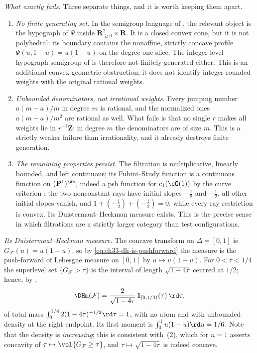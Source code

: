 \begin{example}
\emph{What exactly fails.}  Three separate things, and it is worth keeping
them apart.
\begin{enumerate}
\item \emph{No finite generating set.}  In the semigroup language of
 , the relevant object is the
 hypograph of $\Psi$ inside $\mathbf R^2_{\geq0}\times\mathbf R$.  It is
 a closed convex cone, but it is not polyhedral: its boundary contains the
 nonaffine, strictly concave profile
 $\Psi(u,1-u)=u(1-u)$ on the degree-one slice.
 The integer-level hypograph semigroup of
  is therefore not finitely
 generated either.  This is an additional convex-geometric obstruction;
 it does not identify integer-rounded weights with the original
 rational weights.
\item \emph{Unbounded denominators, not irrational weights.}  Every jumping
 number $a(m-a)/m$ in degree $m$ is rational, and the normalized ones
 $a(m-a)/m^2$ are rational as well.  What fails is that no single $r$
 makes all weights lie in $r^{-1}\mathbf Z$: in degree $m$ the
 denominators are of size $m$.  This is a strictly weaker failure than
 irrationality, and it already destroys finite generation.
 \item \emph{The remaining properties persist.}  The filtration is multiplicative,
 linearly bounded, and left continuous; its Fubini--Study function is a
 continuous function on $(\mathbf P^1)^{\An}$, indeed a
 psh function for $c_1(\cO(1))$ by the curve criterion
 \cite[Example~4.13]{BJ22}: the two nonconstant rays have initial slopes
 $-\tfrac12$ and $-\tfrac12$, all other initial slopes vanish, and
 $1+(-\tfrac12)+(-\tfrac12)=0$, while every ray restriction is convex.
 Its Duistermaat--Heckman measure exists.  This is the precise sense in
 which filtrations are a strictly larger category than test configurations.
\end{enumerate}

\emph{Its Duistermaat--Heckman measure.}  The concave transform on
$\Delta=[0,1]$ is $G_{\mathcal F}(u)=u(1-u)$, so by
\eqref{eq:ch33-dh-is-pushforward} the measure is the push-forward of
Lebesgue measure on $[0,1]$ by $u\mapsto u(1-u)$.  For
$0<\tau<1/4$ the superlevel set $\{G_{\mathcal F}>\tau\}$ is the
interval of length $\sqrt{1-4\tau}$ centred at $1/2$; hence, by
,
\begin{equation}
\label{eq:ch33-harmonic-dh}
 \DHm(\mathcal F)
 =\frac{2}{\sqrt{1-4\tau}}\,\mathbf 1_{[0,1/4)}(\tau)\,\rd\tau ,
\end{equation}
of total mass $\int_0^{1/4}2(1-4\tau)^{-1/2}\rd\tau=1$, with no atom and
with unbounded density at the right endpoint.  Its first moment is
$\int_0^1u(1-u)\rd u=1/6$.  Note that the density is \emph{increasing};
this is consistent with \,(2), which for
$n=1$ asserts concavity of $\tau\mapsto\vol\{G_{\mathcal F}\geq\tau\}$,
and $\tau\mapsto\sqrt{1-4\tau}$ is indeed concave.
\end{example}

